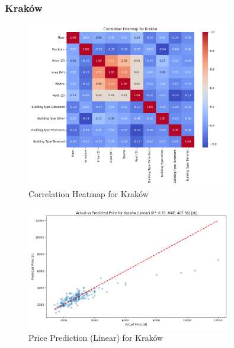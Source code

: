 \subsubsection{Kraków}
\begin{figure}[H]
    \centering
    \includegraphics[width=0.8\textwidth]{figures/krakow_correlation_heatmap.png}
    \caption{Correlation Heatmap for Kraków}
\end{figure}
\begin{figure}[H]
    \centering
    \includegraphics[width=0.8\textwidth]{figures/krakow_price_prediction_linear.png}
    \caption{Price Prediction (Linear) for Kraków}
\end{figure}

